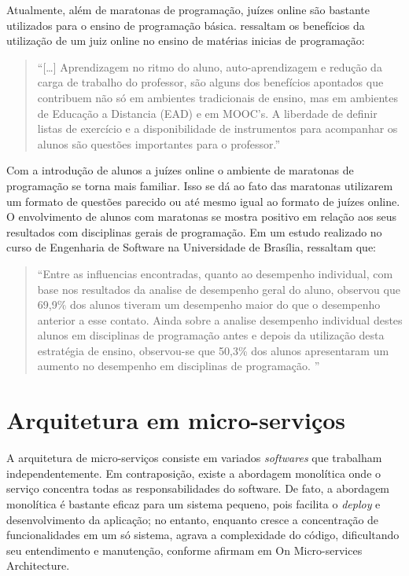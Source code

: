 Atualmente, além de maratonas de programação, juízes online são bastante utilizados para o ensino de programação básica.  ressaltam os benefícios da utilização de um juiz online no ensino de matérias inicias de programação:

\begin{quote}
    ``[\dots] Aprendizagem no ritmo do aluno, auto-aprendizagem e redução da carga de trabalho do professor, são alguns dos benefícios apontados que contribuem não só em ambientes tradicionais de ensino, mas em ambientes de Educação a Distancia (EAD) e em MOOC’s. A liberdade de definir listas de exercício e a disponibilidade de instrumentos para acompanhar os alunos são questões importantes para o professor.'' \cite[p.18-19]{francisco2016juiz}
\end{quote}

Com a introdução de alunos a juízes online o ambiente de maratonas de programação se torna mais familiar. Isso se dá ao fato das maratonas utilizarem um formato de questões parecido ou até mesmo igual ao formato de juízes online. O envolvimento de alunos com maratonas se mostra positivo em relação aos seus resultados com disciplinas gerais de programação. Em um estudo realizado no curso de Engenharia de Software na Universidade de Brasília,  ressaltam que:

\begin{quote}
    ``Entre as influencias encontradas, quanto ao desempenho individual, com base nos resultados da analise de desempenho geral do aluno, observou que 69,9\% dos alunos tiveram um desempenho maior do que o desempenho anterior a esse contato. Ainda sobre a analise desempenho individual destes alunos em disciplinas de programação antes e depois da utilização desta estratégia de ensino, observou-se que 50,3\% dos alunos apresentaram um aumento no desempenho em disciplinas de programação. ''\cite[p.218]{pereiraetal}
\end{quote} 

\section{Arquitetura em micro-serviços}
\label{sec:microServicos}

A arquitetura de micro-serviços consiste em variados \textit{softwares} que trabalham independentemente. Em contraposição, existe a abordagem monolítica onde o serviço concentra todas as responsabilidades do software. De fato, a abordagem monolítica é bastante eficaz para um sistema pequeno, pois facilita o \textit{deploy} e desenvolvimento da aplicação; no entanto, enquanto cresce a concentração de funcionalidades em um só sistema, agrava a complexidade do código, dificultando seu entendimento e manutenção, conforme afirmam  em On Micro-services Architecture.

